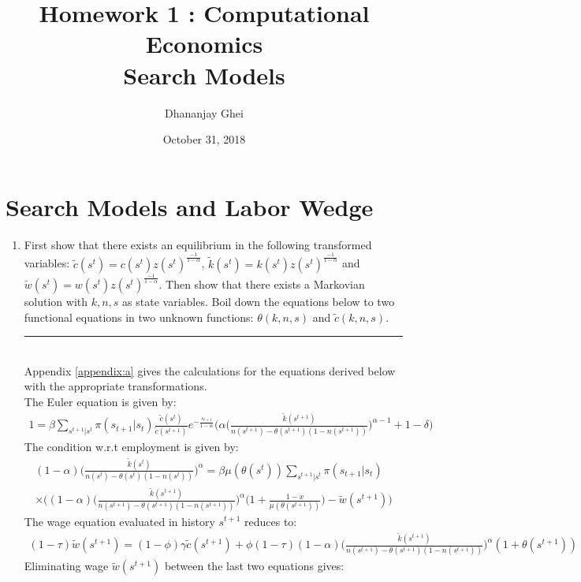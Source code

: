 \documentclass[11pt,letterpaper]{article}
\title{Homework 1 : Computational Economics \\
Search Models}
\author{Dhananjay Ghei}
\date{October 31, 2018}
\newcommand{\Hline}{\noindent\rule{17cm}{0.5pt}}
\begin{document}
\maketitle
\section*{Search Models and Labor Wedge}
\begin{enumerate}
\item First show that there exists an equilibrium in the following
transformed variables: $\tilde{c}(s^t) =
c(s^t)z(s^t)^{\frac{-1}{1-\alpha}}$, $\tilde{k}(s^t) =
k(s^t)z(s^t)^{\frac{-1}{1-\alpha}}$ and $\tilde{w}(s^t) = w(s^t)
z(s^t)^{\frac{-1}{1-\alpha}}$. Then show that there exists a Markovian
solution with $k,n,s$ as state variables. Boil down the equations
below to two functional equations in two unknown functions:
$\theta(k,n,s)$ and $\tilde{c}(k,n,s)$. \\ \Hline \\
Appendix \ref{appendix:a} gives the calculations for the equations
derived below with the appropriate transformations.\\
The Euler equation is given by:
\begin{align*}
  1 = \beta \sum_{s^{t+1}|s^t} \pi(s_{t+1}|s_t)
  \frac{\tilde{c}(s^t)}{\tilde{c}(s^{t+1})}
  e^{-\frac{s_{t+1}}{1-\alpha}} \bigg(\alpha \bigg(
  \frac{\tilde{k}(s^{t+1})}{n(s^{t+1}) - \theta(s^{t+1})
  (1-n(s^{t+1}))}\bigg)^{\alpha-1} + 1 - \delta \bigg)
\end{align*}
The condition w.r.t employment is given by:
\begin{align*}
  (1-\alpha) \bigg(\frac{\tilde{k}(s^t)}{n(s^t)-\theta(s^t)(1-n(s^t))}
  \bigg)^{\alpha} = \beta \mu(\theta(s^t)) \sum_{s^{t+1}|s^t}
  \pi(s_{t+1}|s_t)\\
   \times \bigg( (1-\alpha) \bigg(\frac{\tilde{k}(s^{t+1})}{n(s^{t+1})
  - \theta (s^{t+1}) (1-n(s^{t+1}))}\bigg)^{\alpha} \bigg(1 +
  \frac{1-x}{\mu(\theta (s^{t+1}))} \bigg) - \tilde{w}(s^{t+1}) \bigg)
\end{align*}
The wage equation evaluated in history $s^{t+1}$ reduces to:
\begin{align*}
  (1-\tau) \tilde{w}(s^{t+1}) = (1-\phi) \gamma \tilde{c}(s^{t+1})
  + \phi (1-\tau)(1-\alpha) \bigg(\frac{\tilde{k}(s^{t+1})}{n(s^{t+1})
  - \theta (s^{t+1})(1-n(s^{t+1}))} \bigg)^{\alpha} (1+\theta(s^{t+1}))
\end{align*}
Eliminating wage $\tilde{w}(s^{t+1})$ between the last two equations
gives:
\begin{align*}

\end{align*}
\end{enumerate}
\end{document}
